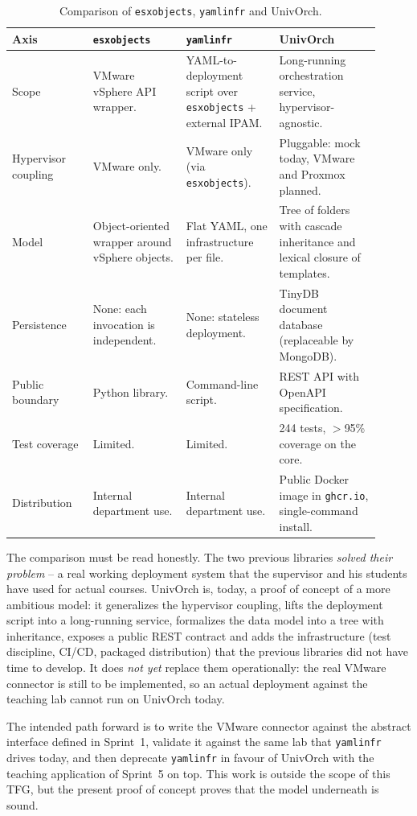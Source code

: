 \begin{table}[ht]
  \centering
  \small
  \begin{tabular}{p{0.20\linewidth} p{0.23\linewidth} p{0.23\linewidth} p{0.25\linewidth}}
    \toprule
    \textbf{Axis} & \textbf{\texttt{esxobjects}} & \textbf{\texttt{yamlinfr}} & \textbf{UnivOrch} \\
    \midrule
    Scope &
    VMware vSphere API wrapper. &
    YAML-to-deployment script over \texttt{esxobjects} + external
    IPAM. &
    Long-running orchestration service, hypervisor-agnostic. \\
    Hypervisor coupling &
    VMware only. &
    VMware only (via \texttt{esxobjects}). &
    Pluggable: mock today, VMware and Proxmox planned. \\
    Model &
    Object-oriented wrapper around vSphere objects. &
    Flat YAML, one infrastructure per file. &
    Tree of folders with cascade inheritance and lexical closure of
    templates. \\
    Persistence &
    None: each invocation is independent. &
    None: stateless deployment. &
    TinyDB document database (replaceable by MongoDB). \\
    Public boundary &
    Python library. &
    Command-line script. &
    REST API with OpenAPI specification. \\
    Test coverage &
    Limited. &
    Limited. &
    244 tests, $>$95\% coverage on the core. \\
    Distribution &
    Internal department use. &
    Internal department use. &
    Public Docker image in \texttt{ghcr.io}, single-command install. \\
    \bottomrule
  \end{tabular}
  \caption{Comparison of \texttt{esxobjects}, \texttt{yamlinfr} and
    UnivOrch.}
  \label{tab:comparison}
\end{table}

The comparison must be read honestly. The two previous libraries
\emph{solved their problem} -- a real working deployment system
that the supervisor and his students have used for actual courses.
UnivOrch is, today, a proof of concept of a more ambitious model:
it generalizes the hypervisor coupling, lifts the deployment script
into a long-running service, formalizes the data model into a tree
with inheritance, exposes a public REST contract and adds the
infrastructure (test discipline, CI/CD, packaged distribution) that
the previous libraries did not have time to develop. It does \emph{not
yet} replace them operationally: the real VMware connector is still
to be implemented, so an actual deployment against the teaching lab
cannot run on UnivOrch today.

The intended path forward is to write the VMware connector against
the abstract interface defined in Sprint~1, validate it against the
same lab that \texttt{yamlinfr} drives today, and then deprecate
\texttt{yamlinfr} in favour of UnivOrch with the teaching
application of Sprint~5 on top. This work is outside the scope of
this TFG, but the present proof of concept proves that the model
underneath is sound.
